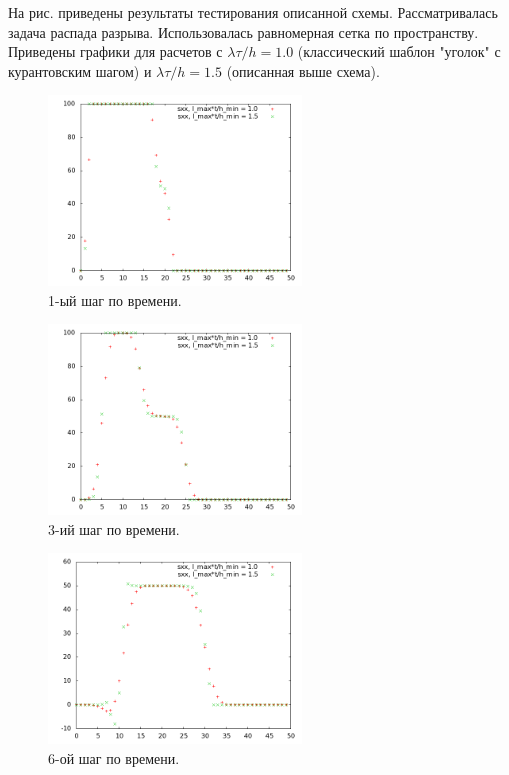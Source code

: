 На рис.  приведены результаты тестирования описанной схемы. Рассматривалась задача распада разрыва. Использовалась равномерная сетка по пространству. Приведены графики для расчетов с $\lambda \tau / h = 1.0$ (классический шаблон "уголок" с курантовским шагом) и $\lambda \tau / h = 1.5$ (описанная выше схема).

\begin{figure}[htp]
\centering
\includegraphics[width=0.6\textwidth]{png/big-sigma-test-results-1d/snap-1.png}
\caption{1-ый шаг по времени.}
\end{figure}

\begin{figure}[htp]
\centering
\includegraphics[width=0.6\textwidth]{png/big-sigma-test-results-1d/snap-3.png}
\caption{3-ий шаг по времени.}
\end{figure}

\begin{figure}[htp]
\centering
\includegraphics[width=0.6\textwidth]{png/big-sigma-test-results-1d/snap-6.png}
\caption{6-ой шаг по времени.}
\end{figure}

